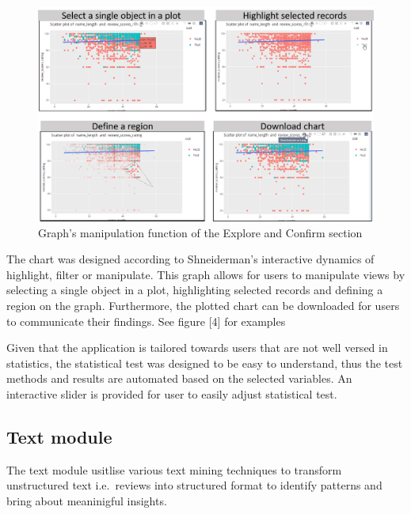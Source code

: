 \documentclass{acm_proc_article-sp}
\begin{document}
\begin{figure}[H]

{\centering \includegraphics[width=1\linewidth]{images/design_explore2} 

}

\caption{Graph's manipulation function of the Explore and Confirm section}\label{fig:unnamed-chunk-4}
\end{figure}

The chart was designed according to Shneiderman's interactive dynamics
of highlight, filter or manipulate. This graph allows for users to
manipulate views by selecting a single object in a plot, highlighting
selected records and defining a region on the graph. Furthermore, the
plotted chart can be downloaded for users to communicate their findings.
See figure {[}4{]} for examples

Given that the application is tailored towards users that are not well
versed in statistics, the statistical test was designed to be easy to
understand, thus the test methods and results are automated based on the
selected variables. An interactive slider is provided for user to easily
adjust statistical test.

\hypertarget{text-module}{%
\subsection{Text module}\label{text-module}}

The text module usitlise various text mining techniques to transform
unstructured text i.e.~reviews into structured format to identify
patterns and bring about meaninigful insights.
\end{document}
